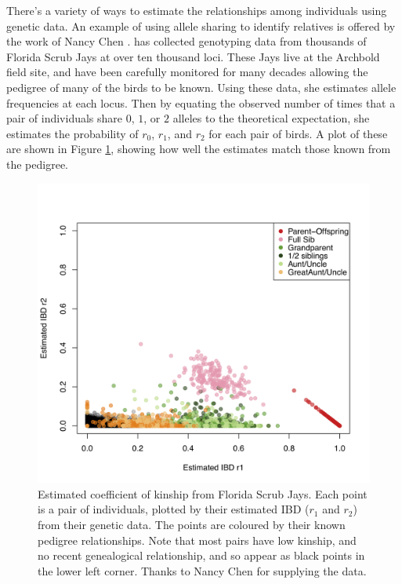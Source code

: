 {{There's a variety of ways to estimate the relationships among
individuals using genetic data.  An example of using allele sharing to identify relatives is offered by
the work of Nancy Chen \citep[in collaboration with Stepfanie
Aguillon, see ][]{chen:16,Aguillon:17}. \citeauthor{chen:16} has collected genotyping data from thousands of
Florida Scrub Jays at over ten thousand loci. These Jays live at the
Archbold field site, and have been carefully monitored for many
decades allowing the pedigree of many of the birds to be known.
Using these data, she estimates allele frequencies at each
locus. Then by equating the observed number of times that a pair of
individuals share $0$, $1$, or $2$ alleles to the theoretical
expectation, she estimates the probability of $r_0$, $r_1$, and
$r_2$ for each pair of birds. A plot of these are shown in Figure
\ref{fig:FSJ_IBD}, showing how well the estimates match those known
from the pedigree.


\begin{figure}
\begin{center}
\includegraphics[width= 0.75 \textwidth]{figures/FSJ_IBD.jpg}
\end{center}
\caption[3cm]{Estimated coefficient
of kinship from Florida Scrub Jays. Each point is a pair of
individuals, plotted by their estimated IBD ($r_1$ and $r_2$) from their genetic data. The
points are coloured by their known pedigree relationships. Note that
most pairs have low kinship, and no recent genealogical relationship,
and so appear as black points in the lower left corner. Thanks to
Nancy Chen for supplying the data.  } \label{fig:FSJ_IBD}
\end{figure}

}}
